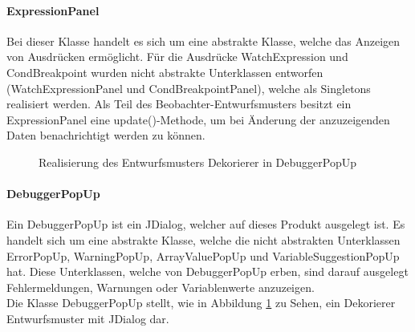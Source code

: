 \documentclass[parskip=full]{scrartcl}
\begin{document}
\paragraph{ExpressionPanel}
Bei dieser Klasse handelt es sich um eine abstrakte Klasse, welche das Anzeigen von Ausdrücken ermöglicht. Für die Ausdrücke WatchExpression und CondBreakpoint wurden nicht abstrakte Unterklassen entworfen (WatchExpressionPanel und CondBreakpointPanel), welche als Singletons realisiert werden.
Als Teil des Beobachter-Entwurfsmusters besitzt ein ExpressionPanel eine update()-Methode, um bei Änderung der anzuzeigenden Daten benachrichtigt werden zu können.
\begin{figure}[!h]
\centering
\caption{Realisierung des Entwurfsmusters Dekorierer in DebuggerPopUp}
\label{guidekorierer}
\end{figure}
\paragraph{DebuggerPopUp}
Ein DebuggerPopUp ist ein JDialog, welcher auf dieses Produkt ausgelegt ist. Es handelt sich um eine abstrakte Klasse, welche die nicht abstrakten Unterklassen ErrorPopUp, WarningPopUp, ArrayValuePopUp und VariableSuggestionPopUp hat. Diese Unterklassen, welche von DebuggerPopUp erben, sind darauf ausgelegt Fehlermeldungen, Warnungen oder Variablenwerte anzuzeigen. \\ 
Die Klasse DebuggerPopUp stellt, wie in Abbildung \ref{guidekorierer} zu Sehen, ein Dekorierer Entwurfsmuster mit JDialog dar.

\end{document}
